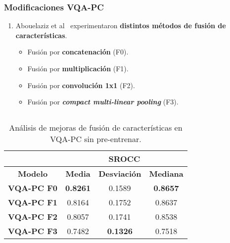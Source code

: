\begin{frame}
  \frametitle{Modificaciones VQA-PC}
  \begin{enumerate}
    \item Abouelaziz et al\footnotemark~ experimentaron \textbf{distintos métodos de fusión de características}.
      \begin{itemize}
        \item Fusión por \textbf{concatenación} (F0).
        \item Fusión por \textbf{multiplicación} (F1). 
        \item Fusión por \textbf{convolución 1x1} (F2).
        \item Fusión por \textbf{\emph{compact multi-linear pooling}} (F3).
      \end{itemize}
  \end{enumerate}
  \begin{columns}
\begin{table}[htp] 
  \scriptsize
  \centering
  \begin{tabular}{|c|c|c|c|}
\hline
\rowcolor[HTML]{FFC702}
                       & \multicolumn{3}{c|}{\textbf{SROCC}}                                                                                                          \\ \hline
\rowcolor[HTML]{FFC702}
\textbf{Modelo}        & \multicolumn{1}{c|}{\textbf{Media}} & \multicolumn{1}{c|}{\textbf{Desviación}} & \multicolumn{1}{c|}{\textbf{Mediana}} \\ \hline
\textbf{VQA-PC F0} & \multicolumn{1}{c|}{\textbf{0.8261}}   & \multicolumn{1}{c|}{0.1589}      & \multicolumn{1}{c|}{\textbf{0.8657}}      \\ \hline
\textbf{VQA-PC F1} & \multicolumn{1}{c|}{0.8164}   & \multicolumn{1}{c|}{0.1752}      & \multicolumn{1}{c|}{0.8637}      \\ \hline
\textbf{VQA-PC F2} & \multicolumn{1}{c|}{0.8057}   & \multicolumn{1}{c|}{0.1741}      & \multicolumn{1}{c|}{0.8538}      \\ \hline
\textbf{VQA-PC F3} & \multicolumn{1}{c|}{0.7482}   & \multicolumn{1}{c|}{\textbf{0.1326}}      & \multicolumn{1}{c|}{0.7518}      \\ \hline
  \end{tabular}
  \caption[Análisis de mejoras de fusión de características en VQA-PC sin pre-entrenar.]{
    Análisis de mejoras de fusión de características en VQA-PC sin pre-entrenar.
}
\label{tab:VQAFromScratch}
\end{table}

\end{columns}
\end{frame}
